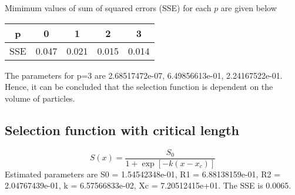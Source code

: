 \documentclass[12pt]{article}
\begin{document}
Mimimum values of sum of squared errors (SSE) for each $p$ are given below 

\begin{center}
	\begin{tabular}{ |c|c|c|c|c| } 
		\hline
		p & 0 & 1 & 2 & 3 \\
		\hline 
		SSE & 0.047 & 0.021 & 0.015 & 0.014 \\ 
		\hline
	\end{tabular}
\end{center}
The parameters for p=3 are 2.68517472e-07, 6.49856613e-01, 2.24167522e-01.
Hence, it can be concluded that the selection function is dependent on the volume of particles.

\subsection{Selection function with critical length}
\begin{equation}
S(x) = \frac{S_0}{1+\exp\left[-k(x-x_c)\right]}
\end{equation}
Estimated parameters are S0 = 1.54542348e-01, R1 = 6.88138159e-01, R2 = 2.04767439e-01, k = 6.57566833e-02,
Xc = 7.20512415e+01.
The SSE is 0.0065.
\end{document}
